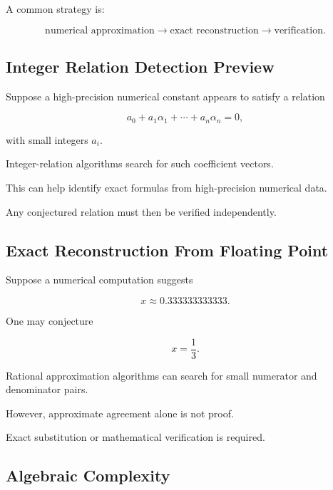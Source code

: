 A common strategy is:

\[
\boxed{
\text{numerical approximation}
\rightarrow
\text{exact reconstruction}
\rightarrow
\text{verification}.
}
\]

\subsection{Integer Relation Detection Preview}
\label{subsec:integer-relation-detection}

Suppose a high-precision numerical constant appears to satisfy a relation

\[
\boxed{
a_0
+
a_1\alpha_1
+
\cdots
+
a_n\alpha_n
=
0,
}
\]

with small integers \(a_i\).

Integer-relation algorithms search for such coefficient vectors.

This can help identify exact formulas from high-precision numerical data.

Any conjectured relation must then be verified independently.

\subsection{Exact Reconstruction From Floating Point}
\label{subsec:exact-reconstruction-floating}

Suppose a numerical computation suggests

\[
x
\approx
0.333333333333.
\]

One may conjecture

\[
\boxed{
x=\frac13.
}
\]

Rational approximation algorithms can search for small numerator and
denominator pairs.

However, approximate agreement alone is not proof.

Exact substitution or mathematical verification is required.

\subsection{Algebraic Complexity}
\label{subsec:algebraic-complexity}


